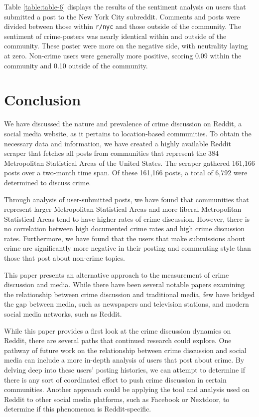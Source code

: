 \documentclass[12pt,oneside, letterpaper]{book}
\begin{document}
\par Table \ref{table:table-6} displays the results of the sentiment analysis on users that submitted a post to the New York City subreddit. Comments and posts were divided between those within \texttt{r/nyc} and those outside of the community. The sentiment of crime-posters was nearly identical within and outside of the community. These poster were more on the negative side, with neutrality laying at zero. Non-crime users were generally more positive, scoring 0.09 within the community and 0.10 outside of the community.

\chapter{Conclusion}

\par We have discussed the nature and prevalence of crime discussion on Reddit, a social media website, as it pertains to location-based communities. To obtain the necessary data and information, we have created a highly available Reddit scraper that fetches all posts from communities that represent the 384 Metropolitan Statistical Areas of the United States. The scraper gathered 161,166 posts over a two-month time span. Of these 161,166 posts, a total of 6,792 were determined to discuss crime. 

\par Through analysis of user-submitted posts, we have found that communities that represent larger Metropolitan Statistical Areas and more liberal Metropolitan Statistical Areas tend to have higher rates of crime discussion. However, there is no correlation between high documented crime rates and high crime discussion rates. Furthermore, we have found that the users that make submissions about crime are significantly more negative in their posting and commenting style than those that post about non-crime topics.

\par This paper presents an alternative approach to the measurement of crime discussion and media. While there have been several notable papers examining the relationship between crime discussion and traditional media, few have bridged the gap between media, such as newspapers and television stations, and modern social media networks, such as Reddit. 

\par While this paper provides a first look at the crime discussion dynamics on Reddit, there are several paths that continued research could explore. One pathway of future work on the relationship between crime discussion and social media can include a more in-depth analysis of users that post about crime. By delving deep into these users' posting histories, we can attempt to determine if there is any sort of coordinated effort to push crime discussion in certain communities. Another approach could be applying the tool and analysis used on Reddit to other social media platforms, such as Facebook or Nextdoor, to determine if this phenomenon is Reddit-specific.
\end{document}
